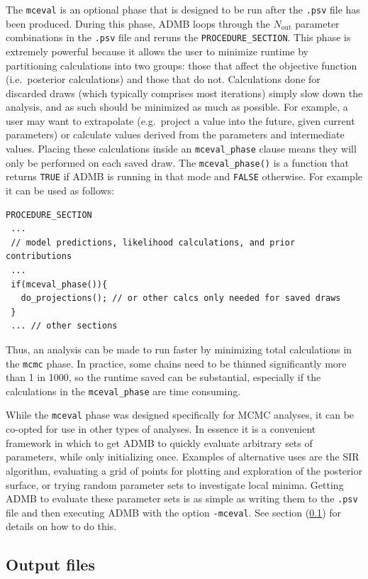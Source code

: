 \documentclass{article}\usepackage[]{graphicx}\usepackage[]{color}
\begin{document}
The \texttt{mceval} is an optional phase that is designed to
be run after the \texttt{.psv} file has been
produced. During this phase, ADMB loops through the
$N_\text{out}$ parameter combinations in the \texttt{.psv}
file and reruns the \texttt{PROCEDURE\_SECTION}. This phase
is extremely powerful because it allows the user to minimize
runtime by partitioning calculations into two groups: those
that affect the objective function (i.e.\ posterior
calculations) and those that do not. Calculations done for
discarded draws (which typically comprises most iterations)
simply slow down the analysis, and as such should be
minimized as much as possible. For example, a user may want
to extrapolate (e.g.\ project a value into the future, given
current parameters) or calculate values derived from the
parameters and intermediate values. Placing these
calculations inside an \texttt{mceval\_phase} clause means
they will only be performed on each saved draw. The
\texttt{mceval\_phase()} is a function that returns
\texttt{TRUE} if ADMB is running in that mode and
\texttt{FALSE} otherwise. For example it can be used as follows:
\begin{verbatim}
PROCEDURE_SECTION
 ...
 // model predictions, likelihood calculations, and prior contributions
 ...
 if(mceval_phase()){
   do_projections(); // or other calcs only needed for saved draws
 }
 ... // other sections
\end{verbatim}

Thus, an
analysis can be made to run faster by minimizing total
calculations in the \texttt{mcmc} phase. In practice, some
chains need to be thinned significantly more than 1 in 1000,
so the runtime saved can be substantial, especially if the
calculations in the \texttt{mceval\_phase} are time
consuming.

While the \texttt{mceval} phase was designed specifically
for MCMC analyses, it can be co-opted for use in other types
of analyses. In essence it is a convenient framework in
which to get ADMB to quickly evaluate arbitrary sets of
parameters, while only initializing once. Examples of
alternative uses are the SIR algorithm, evaluating a grid of
points for plotting and exploration of the posterior
surface, or trying random parameter sets to investigate
local minima. Getting ADMB to evaluate these parameter sets
is as simple as writing them to the \texttt{.psv} file and
then executing ADMB with the option \texttt{-mceval}. See
section (\ref{sec:outfiles}) for details on how to do this.


\subsection{Output files}\label{sec:outfiles}
\end{document}
